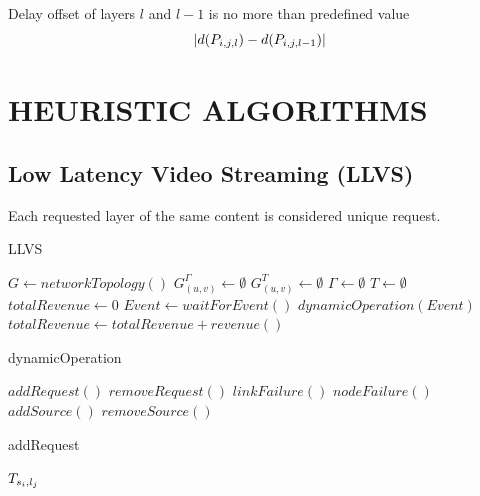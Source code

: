 \documentclass[a4paper, 10pt, conference]{ieeeconf}
\begin{document}
Delay offset of layers $l$ and $l-1$ is no more than predefined value
\begin{equation}
\lvert \dsil{\psilj{i}{j}{l}} - \dsil{\psilj{i}{j}{l-1}} \rvert %
\end{equation}


\section{HEURISTIC ALGORITHMS}
\subsection{Low Latency Video Streaming (LLVS)}

Each requested layer of the same content is considered unique request.

\newpage

\begin{algorithm}
    \caption{LLVS}\label{alg:main}
    \begin{algorithmic}[1]
        \State $G \gets networkTopology()$
        \State $G_{(u,v)}^{\Gamma} \gets \emptyset$
        \State $G_{(u,v)}^T \gets \emptyset$
        \State $\Gamma \gets \emptyset$
        \State $T \gets \emptyset$
        \State $totalRevenue \gets 0$
            \State $Event \gets waitForEvent()$
            \State $dynamicOperation(Event)$    
            \State $totalRevenue \gets totalRevenue+revenue()$
        \EndWhile
    \EndProcedure
    \end{algorithmic}
\end{algorithm}

\begin{algorithm}
    \caption{dynamicOperation}\label{alg:dynamicOperation}
    \begin{algorithmic}[1]
                \State $addRequest()$
            \EndCase
                \State $removeRequest()$
            \EndCase
                \State $linkFailure()$
            \EndCase
                \State $nodeFailure()$
            \EndCase
                \State $addSource()$
            \EndCase
                \State $removeSource()$
            \EndCase
        \EndSwitch
    \EndProcedure
    \end{algorithmic}
\end{algorithm}
\begin{algorithm}
    \caption{addRequest}\label{alg:addRequest}
    \begin{algorithmic}[1]
        \State $T_{s_i,l_j}$
    \EndProcedure
\end{algorithmic}
\end{algorithm}
\end{document}
